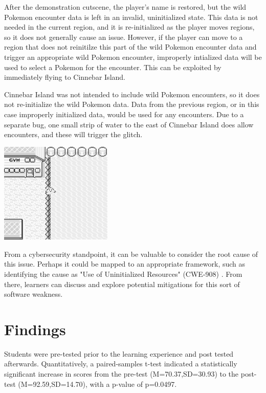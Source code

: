 \documentclass[letterpaper]{article}
\begin{document}
After the demonstration cutscene, the player's name is restored, but the wild Pokemon encounter data is left in an invalid, uninitialized state. This data is not needed in the current region, and it is re-initialized as the player moves regions, so it does not generally cause an issue. However, if the player can move to a region that does not reinitilze this part of the wild Pokemon encounter data and trigger an appropriate wild Pokemon encounter, improperly intialized data will be used to select a Pokemon for the encounter. This can be exploited by immediately flying to Cinnebar Island.

Cinnebar Island was not intended to include wild Pokemon encounters, so it does not re-initialize the wild Pokemon data. Data from the previous region, or in this case improperly initialized data, would be used for any encounters. Due to a separate bug, one small strip of water to the east of Cinnebar Island does allow encounters, and these will trigger the glitch.

\noindent %
\begin{minipage}{\textwidth}
    \centering
    \includegraphics[width=0.4\textwidth]{surfing.png}
    \label{fig:surfing}
\end{minipage}

From a cybersecurity standpoint, it can be valuable to consider the root cause of this issue. Perhaps it could be mapped to an appropriate framework, such as identifying the cause as "Use of Uninitialized Resources" (CWE-908) \cite{mitre2012}. From there, learners can discuss and explore potential mitigations for this sort of software weakness.

\section{Findings}
Students were pre-tested prior to the learning experience and post tested afterwards. Quantitatively, a paired-samples t-test indicated a statistically significant increase in scores from the pre-test (M=70.37,SD=30.93) to the post-test (M=92.59,SD=14.70), with a p-value of p=0.0497.
\end{document}
